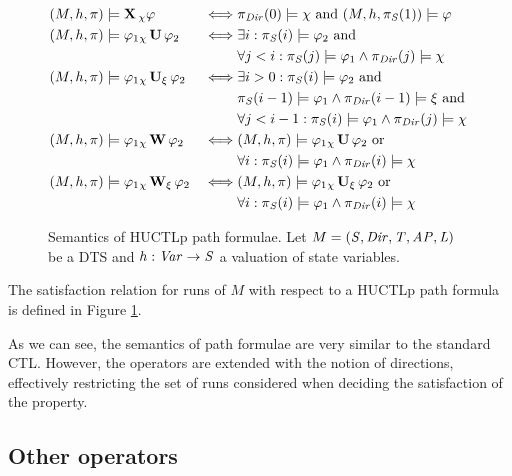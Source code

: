 \begin{figure}
		\begin{alignat*}{2}
		(M,h,\pi) &\models \operatorname{\mathbf{X}}{}_{\chi} \varphi								& \iff & \pi_{\mathit{Dir}}(0) \models \chi \text{ and } (M, h, \pi_{\mathit{S}}(1)) \models \varphi \\
		(M,h,\pi) &\models \varphi_1 {}_{\chi}\operatorname{\mathbf{U}} \varphi_2		  & \iff & \exists i : \pi_{\mathit{S}}(i) \models \varphi_2 \text{ and } \\
		&																		 & 		 & \forall j < i : \pi_{\mathit{S}}(j) \models \varphi_1 \land \pi_{\mathit{Dir}}(j) \models \chi \\
		(M,h,\pi) &\models \varphi_1 {}_{\chi}\operatorname{\mathbf{U}}_{\xi} \varphi_2 	 & \iff & \exists i > 0 : \pi_{\mathit{S}}(i) \models \varphi_2 \text{ and } \\
		&																		  & 	 & \pi_{\mathit{S}}(i-1) \models \varphi_1 \land \pi_{\mathit{Dir}}(i-1) \models \xi  \text{ and } \\
		& 																	  & 	 & \forall j < i - 1 : \pi_{\mathit{S}}(i) \models \varphi_1 \land \pi_{\mathit{Dir}}(j) \models \chi \\
		(M,h,\pi) &\models \varphi_1 {}_{\chi}\operatorname{\mathbf{W}} \varphi_2		  & \iff & (M,h,\pi) \models \varphi_1 {}_{\chi}\operatorname{\mathbf{U}} \varphi_2 \text{ or } \\
		&																		 & 		 & \forall i : \pi_{\mathit{S}}(i) \models \varphi_1 \land \pi_{\mathit{Dir}}(i) \models \chi \\
		(M,h,\pi) &\models \varphi_1 {}_{\chi}\operatorname{\mathbf{W}}_{\xi} \varphi_2		  & \iff & (M,h,\pi) \models \varphi_1 {}_{\chi}\operatorname{\mathbf{U}}_{\xi} \varphi_2 \text{ or } \\
		&																		 & 		 & \forall i : \pi_{\mathit{S}}(i) \models \varphi_1 \land \pi_{\mathit{Dir}}(i) \models \chi \\
		\end{alignat*}
		
		\caption{Semantics of \ac{HUCTLp} path formulae. Let $M = (\mathit{S}, \mathit{Dir}, \mathit{T}, \mathit{AP}, \mathit{L})$ be a \ac{DTS} and $h : \mathit{Var} \to \mathit{S}$ a valuation of state variables.}
	\label{fig:semPath}
\end{figure}

The satisfaction relation for runs of $M$ with respect to a \ac{HUCTLp} path formula is defined in Figure \ref{fig:semPath}.

As we can see, the semantics of path formulae are very similar to the standard \ac{CTL}. However, the operators are extended with the notion of directions, effectively restricting the set of runs considered when deciding the satisfaction of the property.

\subsection{Other operators}

